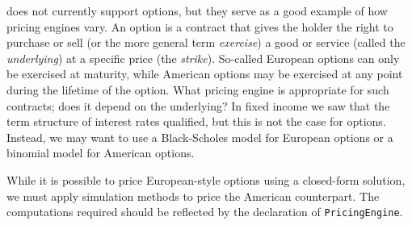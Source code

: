\hql does not currently support options, but they serve as a good example
of how pricing engines vary. 
An option is a contract that gives the holder the right to purchase or sell
(or the more general term \emph{exercise}) a good or service (called the
\emph{underlying}) at a specific price (the \emph{strike}). So-called European
options can only be exercised at maturity, while American options may be 
exercised at any point during the lifetime of the option.
What pricing engine is appropriate for such contracts; does it depend on the
underlying? In fixed income we saw that the term structure of interest rates
qualified, but this is not the case for options.\\

Instead, we may want to use a Black-Scholes model for European
options or a binomial model for American options\cite{HULL}.

While it is possible to price European-style options using a closed-form 
solution, we must apply simulation methods to price the American counterpart.
The computations required should be reflected by the declaration of
\texttt{PricingEngine}.

